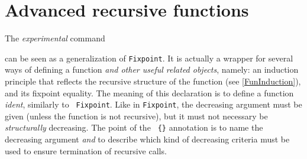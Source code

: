 






\section{Advanced recursive functions}

The \emph{experimental} command 
\begin{center}
   \label{Function}
\end{center}
can be seen as a generalization of {\tt Fixpoint}.  It is actually a
wrapper for several ways of defining a function \emph{and other useful
  related objects}, namely: an induction principle that reflects the
recursive structure of the function (see \ref{FunInduction}), and its
fixpoint equality.  The meaning of this
declaration is to define a function {\it ident}, similarly to {\tt
  Fixpoint}. Like in {\tt Fixpoint}, the decreasing argument must be
given (unless the function is not recursive), but it must not
necessary be \emph{structurally} decreasing. The point of the {\tt
  \{\}} annotation is to name the decreasing argument \emph{and} to
describe which kind of decreasing criteria must be used to ensure
termination of recursive calls.

